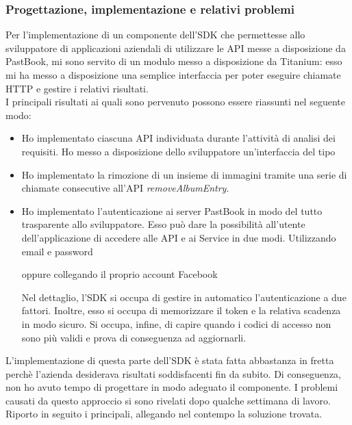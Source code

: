 			\subsubsection{Progettazione, implementazione e relativi problemi}
				Per l'implementazione di un componente dell'SDK che permettesse allo sviluppatore di applicazioni aziendali di
				utilizzare le API messe a disposizione da PastBook, mi sono servito di un modulo messo a disposizione da Titanium:
				esso mi ha messo a disposizione una semplice interfaccia per poter eseguire chiamate HTTP e gestire i relativi
				risultati.\\
				I principali risultati ai quali sono pervenuto possono essere riassunti nel seguente modo:
				\begin{itemize}
					\item Ho implementato ciascuna API individuata durante l'attività di analisi dei requisiti. Ho messo a
					disposizione dello sviluppatore un'interfaccia del tipo
					
					\item Ho implementato la rimozione di un insieme di immagini tramite una serie di chiamate consecutive
					all'API \emph{removeAlbumEntry}.
					\item Ho implementato l'autenticazione ai server PastBook in modo del tutto trasparente allo sviluppatore.
					Esso può dare la possibilità all'utente dell'applicazione di accedere alle API e ai Service in due modi.
					Utilizzando email e password
					
					oppure collegando il proprio account Facebook
					
					Nel dettaglio, l'SDK si occupa di gestire in automatico l'autenticazione a due fattori. Inoltre, esso si
					occupa di memorizzare il token e la relativa scadenza in modo sicuro. Si occupa, infine, di capire quando i
					codici di accesso non sono più validi e prova di conseguenza ad aggiornarli.
				\end{itemize}
				L'implementazione di questa parte dell'SDK è stata fatta abbastanza in fretta perchè l'azienda desiderava risultati
				soddisfacenti fin da subito. Di conseguenza, non ho avuto tempo di progettare in modo adeguato il componente. I
				problemi causati da questo approccio si sono rivelati dopo qualche settimana di lavoro. Riporto in seguito i
				principali, allegando nel contempo la soluzione trovata.

